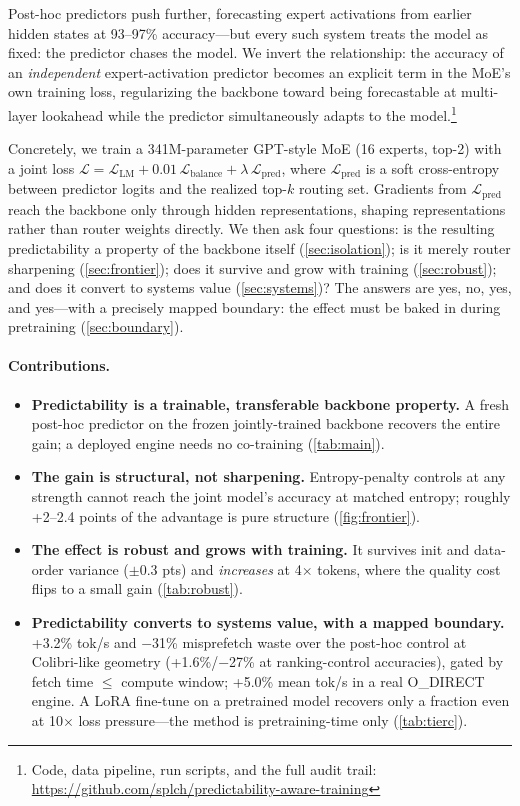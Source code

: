 \documentclass[10pt,letterpaper]{article}
\newcommand{\calL}{\mathcal{L}}
\begin{document}
Post-hoc predictors push further, forecasting expert activations from earlier hidden states at 93--97\% accuracy---but every such system treats the model as fixed: the predictor chases the model. We invert the relationship: the accuracy of an \emph{independent} expert-activation predictor becomes an explicit term in the MoE's own training loss, regularizing the backbone toward being forecastable at multi-layer lookahead while the predictor simultaneously adapts to the model.\footnote{Code, data pipeline, run scripts, and the full audit trail: \url{https://github.com/splch/predictability-aware-training}}

Concretely, we train a 341M-parameter GPT-style MoE (16 experts, top-2) with a joint loss $\calL = \calL_{\mathrm{LM}} + 0.01\,\calL_{\mathrm{balance}} + \lambda\,\calL_{\mathrm{pred}}$, where $\calL_{\mathrm{pred}}$ is a soft cross-entropy between predictor logits and the realized top-$k$ routing set. Gradients from $\calL_{\mathrm{pred}}$ reach the backbone only through hidden representations, shaping representations rather than router weights directly. We then ask four questions: is the resulting predictability a property of the backbone itself (\cref{sec:isolation}); is it merely router sharpening (\cref{sec:frontier}); does it survive and grow with training (\cref{sec:robust}); and does it convert to systems value (\cref{sec:systems})? The answers are yes, no, yes, and yes---with a precisely mapped boundary: the effect must be baked in during pretraining (\cref{sec:boundary}).

\paragraph{Contributions.}
\begin{itemize}[leftmargin=1.5em]
  \item \textbf{Predictability is a trainable, transferable backbone property.} A fresh post-hoc predictor on the frozen jointly-trained backbone recovers the entire gain; a deployed engine needs no co-training (\cref{tab:main}).
  \item \textbf{The gain is structural, not sharpening.} Entropy-penalty controls at any strength cannot reach the joint model's accuracy at matched entropy; roughly +2--2.4 points of the advantage is pure structure (\cref{fig:frontier}).
  \item \textbf{The effect is robust and grows with training.} It survives init and data-order variance ($\pm$0.3 pts) and \emph{increases} at 4$\times$ tokens, where the quality cost flips to a small gain (\cref{tab:robust}).
  \item \textbf{Predictability converts to systems value, with a mapped boundary.} +3.2\% tok/s and $-$31\% misprefetch waste over the post-hoc control at Colibri-like geometry (+1.6\%/$-$27\% at ranking-control accuracies), gated by fetch time $\le$ compute window; +5.0\% mean tok/s in a real O\_DIRECT engine. A LoRA fine-tune on a pretrained model recovers only a fraction even at 10$\times$ loss pressure---the method is pretraining-time only (\cref{tab:tierc}).
\end{itemize}
\end{document}
